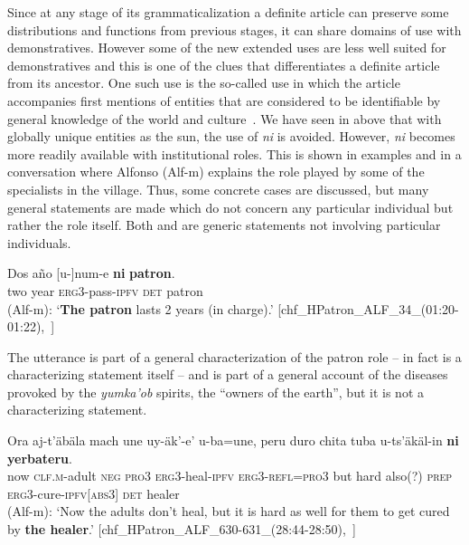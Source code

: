 \documentclass[output=paper
,modfonts
,nonflat]{langsci/langscibook}
\begin{document}
Since at any stage of its grammaticalization a definite article can preserve some distributions and functions from previous stages, it can share domains of use with demonstratives. However some of the new extended uses are less well suited for demonstratives and this is one of the clues that differentiates a definite article from its ancestor. 
One such use is the so-called  use in which the article accompanies first mentions of entities that are considered to be identifiable by general knowledge of the world and culture~\citep[][]{Himmelmann2001}. We have seen in  above that with globally unique entities as the sun, the use of \textit{ni} is avoided. However, \textit{ni} becomes more readily available with institutional roles. This is shown in examples  and  in a conversation where Alfonso (Alf-m) explains the role played by some of the specialists in the village. Thus, some concrete cases are discussed, but many general statements are made which do not concern any particular individual but rather the role itself. Both  and  are generic statements not involving particular individuals. 

\ea \label{ex:pico:50}

\gll Dos a\~no [u-]num-e \textbf{ni} \textbf{patron}.\\
{two} {year} \textsc{erg3}-{pass}-\textsc{ipfv} \textsc{det} {patron}\\
\glt (Alf-m): `\textbf{The patron} lasts 2 years (in charge).' [chf\_HPatron\_ALF\_34\_(01:20-01:22),~\citealt{Delgado-Galvan2018archive}]
\z


The utterance  is part of a general characterization of the patron role -- in fact  is a characterizing statement itself -- and  is part of a general account of the diseases provoked by the \textit{yumka'ob} spirits, the ``owners of the earth'', but it is not a characterizing statement.

\ea \label{ex:pico:51}

\gll Ora aj-t'äbäla mach une uy-äk'-e' u-ba=une, peru duro chita tuba u-ts'äkäl-in \textbf{ni} \textbf{yerbateru}.\\
now \textsc{clf.m}-adult \textsc{neg} \textsc{pro3} \textsc{erg3}-{heal}-\textsc{ipfv} \textsc{erg3}-\textsc{refl}=\textsc{pro3} but {hard} also(?) \textsc{prep} \textsc{erg3}-{cure}-\textsc{ipfv[abs3]} \textsc{det} healer\\
\glt (Alf-m): `Now the adults don't heal, but it is hard as well for them to get cured by \textbf{the healer}.' [chf\_HPatron\_ALF\_630-631\_(28:44-28:50),~\citealt{Delgado-Galvan2018archive}]
\z
\end{document}
